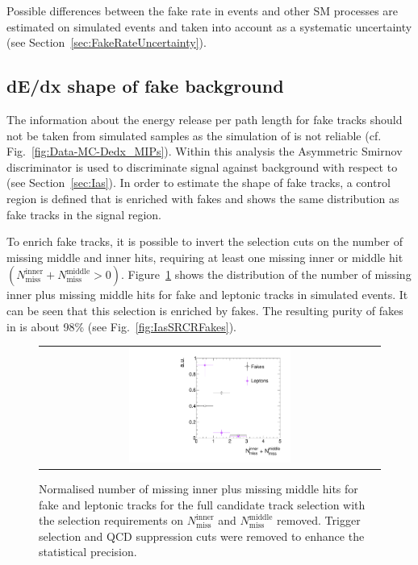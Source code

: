 Possible differences between the fake rate in \Zlep events and other SM processes are estimated on simulated events and taken into account as a systematic uncertainty (see Section~\ref{sec:FakeRateUncertainty}).

\subsection{dE/dx shape of fake background}
The information about the energy release per path length for fake tracks should not be taken from simulated samples as the simulation of \dedx is not reliable (cf. Fig.~\ref{fig:Data-MC-Dedx_MIPs}).
Within this analysis the Asymmetric Smirnov discriminator \ias is used to discriminate signal against background with respect to \dedx (see Section~\ref{sec:Ias}). 
In order to estimate the \ias shape of fake tracks, a control region \fakeCR is defined that is enriched with fakes and shows the same \ias distribution as fake tracks in the signal region.

To enrich fake tracks, it is possible to invert the selection cuts on the number of missing middle and inner hits, \ie requiring at least one missing inner or middle hit $\left( N_{\text{miss}}^{\text{inner}} +N_{\text{miss}}^{\text{middle}}>0\right)$.
Figure~\ref{fig:NMissInnerAndMiddle} shows the distribution of the number of missing inner plus missing middle hits for fake and leptonic tracks in simulated \WJets events.
It can be seen that this selection is enriched by fakes.
The resulting purity of fakes in \fakeCR is about 98\% (see Fig.~\ref{fig:IasSRCRFakes}). 
\begin{figure}[!t]
  \centering 
  \begin{tabular}{c}
    \includegraphics[width=0.49\textwidth]{figures/analysis/Background/NLostInnerPlusMiddleForAllBkg_chiTracksQCDsupressionTrigger.pdf}
  \end{tabular}
  \caption{Normalised number of missing inner plus missing middle hits for fake and leptonic tracks for the full candidate track selection with the selection requirements on $N_{\text{miss}}^{\text{inner}}$ and $N_{\text{miss}}^{\text{middle}}$ removed. Trigger selection and QCD suppression cuts were removed to enhance the statistical precision.}
  \label{fig:NMissInnerAndMiddle}
\end{figure}


